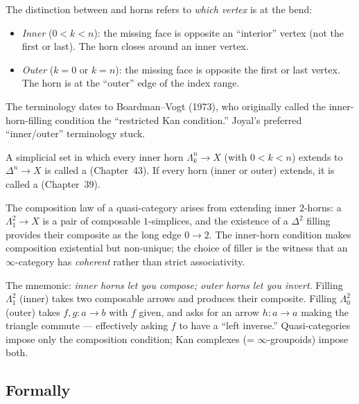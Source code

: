 \begin{nameorigin}
The distinction between  and  horns refers to
\emph{which vertex} is at the bend:
\begin{itemize}
  \item \emph{Inner} ($0 < k < n$): the missing face is opposite an
        ``interior'' vertex (not the first or last). The horn closes
        around an inner vertex.
  \item \emph{Outer} ($k = 0$ or $k = n$): the missing face is opposite
        the first or last vertex. The horn is at the ``outer'' edge of
        the index range.
\end{itemize}
The terminology dates to Boardman–Vogt (1973), who originally called
the inner-horn-filling condition the ``restricted Kan condition.''
Joyal's preferred ``inner/outer'' terminology stuck.
\end{nameorigin}

\begin{remark}
A simplicial set in which every inner horn $\Lambda^n_k \to X$ (with
$0 < k < n$) extends to $\Delta^n \to X$ is called a 
(Chapter~43). If every horn (inner or outer) extends, it is called a
 (Chapter~39).

The composition law of a quasi-category arises from extending inner
$2$-horns: a $\Lambda^2_1 \to X$ is a pair of composable $1$-simplices,
and the existence of a $\Delta^2$ filling provides their composite as the
long edge $0 \to 2$. The inner-horn condition makes composition
existential but non-unique; the choice of filler is the witness that an
$\infty$-category has \emph{coherent} rather than strict associativity.
\end{remark}

\begin{readernote}
The mnemonic: \emph{inner horns let you compose; outer horns let you
invert}. Filling $\Lambda^2_1$ (inner) takes two composable arrows and
produces their composite. Filling $\Lambda^2_0$ (outer) takes
$f, g : a \to b$ with $f$ given, and asks for an arrow $h : a \to a$
making the triangle commute — effectively asking $f$ to have a
``left inverse.'' Quasi-categories impose only the composition
condition; Kan complexes (= $\infty$-groupoids) impose both.
\end{readernote}

\subsection{Formally}

